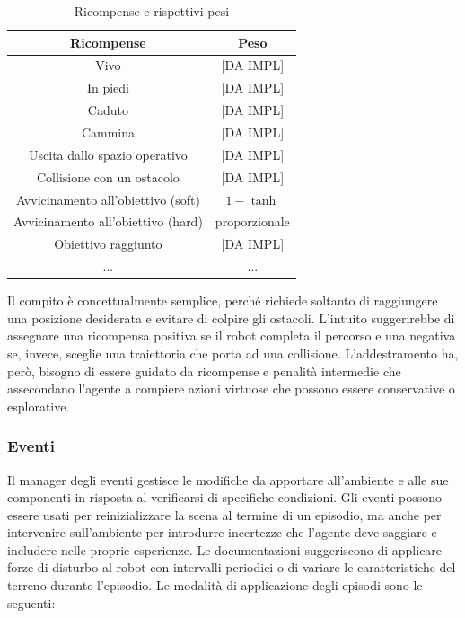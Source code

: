 
\begin{table}[h]
    \centering
    \begin{tabular}{|c|c|}
    \hline
    \textbf{Ricompense} & \textbf{Peso} \\ \hline
    Vivo & [DA IMPL] \\ \hline
    In piedi & [DA IMPL] \\ \hline
    Caduto & [DA IMPL] \\ \hline
    Cammina & [DA IMPL] \\ \hline
    Uscita dallo spazio operativo & [DA IMPL] \\ \hline
    Collisione con un ostacolo & [DA IMPL] \\ \hline
    Avvicinamento all'obiettivo (soft) & $1-\tanh$ \\ \hline
    Avvicinamento all'obiettivo (hard) & proporzionale \\ \hline
    Obiettivo raggiunto & [DA IMPL] \\ \hline
    ...& ...\\ \hline
    \end{tabular}
    \caption{Ricompense e rispettivi pesi}
    \label{tab:rew}
\end{table}

Il compito è concettualmente semplice, perché richiede soltanto di raggiungere una posizione desiderata e evitare di colpire gli ostacoli. L'intuito suggerirebbe di assegnare una ricompensa positiva se il robot completa il percorso e una negativa se, invece, sceglie una traiettoria che porta ad una collisione. L'addestramento ha, però, bisogno di essere guidato da ricompense e penalità intermedie che assecondano l'agente a compiere azioni virtuose che possono essere conservative o esplorative.  




\subsubsection{Eventi}
Il manager degli eventi gestisce le modifiche da apportare all'ambiente e alle sue componenti in risposta al verificarsi di specifiche condizioni. Gli eventi possono essere usati per reinizializzare la scena al termine di un episodio, ma anche per intervenire sull'ambiente per introdurre incertezze che l'agente deve saggiare e includere nelle proprie esperienze. Le documentazioni \cite{nvidiaIsaacLab2025} suggeriscono di applicare forze di disturbo al robot con intervalli periodici o di variare le caratteristiche del terreno durante l'episodio. Le modalità di applicazione degli episodi sono le seguenti:

